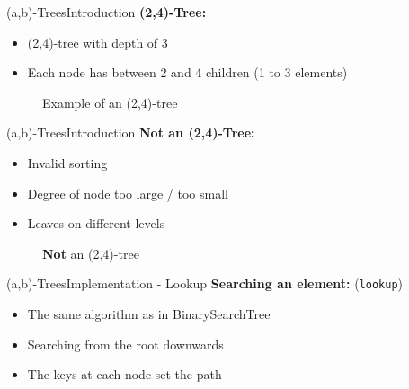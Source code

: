 
\begin{frame}{(a,b)-Trees}{Introduction}
  \textbf{(2,4)-Tree:}
  \begin{itemize}
    \item<2->
      (2,4)-tree with depth of 3
    \item<3->
      Each node has between 2 and 4 children (1 to 3 elements)
  \end{itemize}
  \begin{figure}
    \begin{adjustbox}{width=0.75\linewidth}
      
    \end{adjustbox}
    \caption{Example of an (2,4)-tree}
    \label{fig:a_b_tree:tree_introduction}
  \end{figure}
\end{frame}


\begin{frame}{(a,b)-Trees}{Introduction}
  \textbf{Not an (2,4)-Tree:}
  \begin{itemize}
    \item<2->
      Invalid sorting
    \item<3->
      Degree of node too large / too small
    \item<4->
      Leaves on different levels
  \end{itemize}
  \begin{figure}
    \begin{adjustbox}{width=0.5\linewidth}
      
    \end{adjustbox}
    \caption{\textbf{Not} an (2,4)-tree}
    \label{fig:a_b_tree:tree_invalid_introduction}
  \end{figure}
\end{frame}


\begin{frame}{(a,b)-Trees}{Implementation - Lookup}
  \textbf{Searching an element:} (\texttt{\color{Mittel-Blau}lookup})
  \begin{itemize}
    \item<2->
      The same algorithm as in {\color{Mittel-Blau}BinarySearchTree}
    \item<3->
      Searching from the root downwards
    \item<4->
      The keys at each node set the path
  \end{itemize}
\end{frame}

